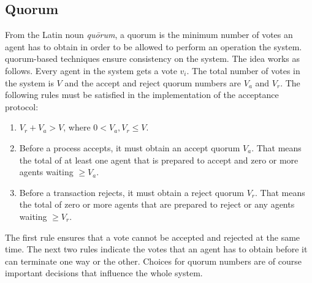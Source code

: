 \subsection{Quorum}
From the Latin noun \textit{qu\=orum}, a quorum is the minimum number of votes an agent has to obtain in order to be allowed to perform an operation the system. quorum-based techniques ensure consistency on the system.  The idea works as follows. Every agent in the system gets a vote $v_{i}$. The total number of votes in the system is $V$ and the accept and reject quorum numbers are $V_{a}$ and $V_{r}$. The following rules must be satisfied in the implementation of the acceptance protocol:
\begin{enumerate}
	\item $V_{r} + V_{a} > V$, where $0 < V_{a}, V_{r} \leq  V$.
	\item Before a process accepts, it must obtain an accept quorum $V_{a}$. That means the total of at least one agent that is prepared to accept and zero or more agents waiting $\geq V_{a}$.
	\item Before a transaction rejects, it must obtain a reject quorum $V_{r}$. That means the total of zero or more agents that are prepared to reject or any agents waiting $\geq  V_{r}$.
\end{enumerate}
The first rule ensures that a vote cannot be accepted and rejected at the same time. The next two rules indicate the votes that an agent has to obtain before it can terminate one way or the other. Choices for quorum numbers are of course important decisions that influence the whole system.~\cite{Ozsu1999}
